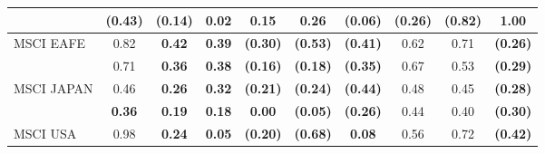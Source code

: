 \documentclass[12pt]{article}
\begin{document}
\begin{table}[H]
\begin{center}
{\begin{tabular}{@{}lccccccccc@{}}
                      & {\color[HTML]{303498} \textbf{(0.43)}} & {\color[HTML]{303498} \textbf{(0.14)}} & {\color[HTML]{303498} \textbf{0.02}}   & {\color[HTML]{303498} \textbf{0.15}}   & {\color[HTML]{303498} 0.26}            & {\color[HTML]{303498} \textbf{(0.06)}} & {\color[HTML]{303498} \textbf{(0.26)}} & {\color[HTML]{303498} \textbf{(0.82)}} & {\color[HTML]{303498} 1.00}            \\ \midrule
MSCI EAFE             & 0.82                                   & \textbf{0.42}                          & \textbf{0.39}                          & \textbf{(0.30)}                        & \textbf{(0.53)}                        & \textbf{(0.41)}                        & 0.62                                   & 0.71                                   & \textbf{(0.26)}                        \\
                      & {\color[HTML]{303498} 0.71}            & {\color[HTML]{303498} \textbf{0.36}}   & {\color[HTML]{303498} \textbf{0.38}}   & {\color[HTML]{303498} \textbf{(0.16)}} & {\color[HTML]{303498} \textbf{(0.18)}} & {\color[HTML]{303498} \textbf{(0.35)}} & {\color[HTML]{303498} 0.67}            & {\color[HTML]{303498} 0.53}            & {\color[HTML]{303498} \textbf{(0.29)}} \\
MSCI JAPAN            & 0.46                                   & \textbf{0.26}                          & \textbf{0.32}                          & \textbf{(0.21)}                        & \textbf{(0.24)}                        & \textbf{(0.44)}                        & 0.48                                   & 0.45                                   & \textbf{(0.28)}                        \\
                      & {\color[HTML]{303498} \textbf{0.36}}   & {\color[HTML]{303498} \textbf{0.19}}   & {\color[HTML]{303498} \textbf{0.18}}   & {\color[HTML]{303498} \textbf{0.00}}   & {\color[HTML]{303498} \textbf{(0.05)}} & {\color[HTML]{303498} \textbf{(0.26)}} & {\color[HTML]{303498} 0.44}            & {\color[HTML]{303498} 0.40}            & {\color[HTML]{303498} \textbf{(0.30)}} \\
MSCI USA              & 0.98                                   & \textbf{0.24}                          & \textbf{0.05}                          & \textbf{(0.20)}                        & \textbf{(0.68)}                        & \textbf{0.08}                          & 0.56                                   & 0.72                                   & \textbf{(0.42)}                        \\

\end{tabular}}
\end{center}
\end{table}
\end{document}
